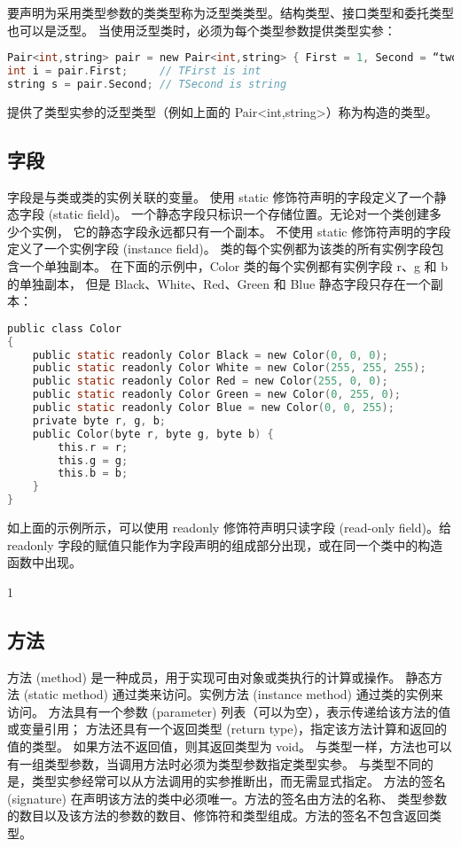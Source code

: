 要声明为采用类型参数的类类型称为泛型类类型。结构类型、接口类型和委托类型也可以是泛型。
当使用泛型类时，必须为每个类型参数提供类型实参：

 \begin{lstlisting}[language=C] 
Pair<int,string> pair = new Pair<int,string> { First = 1, Second = “two” };
int i = pair.First;     // TFirst is int
string s = pair.Second; // TSecond is string
 \end{lstlisting}

提供了类型实参的泛型类型（例如上面的 Pair<int,string>）称为构造的类型。

\subsection{字段}
字段是与类或类的实例关联的变量。
使用 static 修饰符声明的字段定义了一个静态字段 (static field)。
一个静态字段只标识一个存储位置。无论对一个类创建多少个实例，
它的静态字段永远都只有一个副本。
不使用 static 修饰符声明的字段定义了一个实例字段 (instance field)。
类的每个实例都为该类的所有实例字段包含一个单独副本。
在下面的示例中，Color 类的每个实例都有实例字段 r、g 和 b 的单独副本，
但是 Black、White、Red、Green 和 Blue 静态字段只存在一个副本：

 \begin{lstlisting}[language=C] 
public class Color
{
    public static readonly Color Black = new Color(0, 0, 0);
    public static readonly Color White = new Color(255, 255, 255);
    public static readonly Color Red = new Color(255, 0, 0);
    public static readonly Color Green = new Color(0, 255, 0);
    public static readonly Color Blue = new Color(0, 0, 255);
    private byte r, g, b;
    public Color(byte r, byte g, byte b) {
        this.r = r;
        this.g = g;
        this.b = b;
    }
}
 \end{lstlisting}

如上面的示例所示，可以使用 readonly 修饰符声明只读字段 (read-only field)。给 readonly 字段的赋值只能作为字段声明的组成部分出现，或在同一个类中的构造函数中出现。

1\subsection{方法}

方法 (method) 是一种成员，用于实现可由对象或类执行的计算或操作。
静态方法 (static method) 通过类来访问。实例方法 (instance method) 通过类的实例来访问。
方法具有一个参数 (parameter) 列表（可以为空），表示传递给该方法的值或变量引用；
方法还具有一个返回类型 (return type)，指定该方法计算和返回的值的类型。
如果方法不返回值，则其返回类型为 void。
与类型一样，方法也可以有一组类型参数，当调用方法时必须为类型参数指定类型实参。
与类型不同的是，类型实参经常可以从方法调用的实参推断出，而无需显式指定。
方法的签名 (signature) 在声明该方法的类中必须唯一。方法的签名由方法的名称、
类型参数的数目以及该方法的参数的数目、修饰符和类型组成。方法的签名不包含返回类型。

